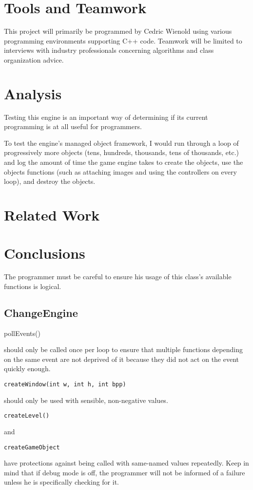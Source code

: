\documentclass[12pt]{article}
\begin{document}
  \section{Tools and Teamwork}
    This project will primarily be programmed by Cedric Wienold using various programming environments supporting C++ code. Teamwork will be limited to interviews with industry professionals concerning algorithms and class organization advice.

  \section{Analysis}
    Testing this engine is an important way of determining if its current programming is at all useful for programmers.

    To test the engine's managed object framework, I would run through a loop of progressively more objects (tens, hundreds, thousands, tens of thousands, etc.) and log the amount of time the game engine takes to create the objects, use the objects functions (such as attaching images and using the controllers on every loop), and destroy the objects.

  \section{Related Work}

  \section{Conclusions}
    The programmer must be careful to ensure his usage of this class's available functions is logical.
\subsection{ChangeEngine}
\begin{verbatim*}pollEvents()\end{verbatim*} should only be called once per loop to ensure that multiple functions depending on the same event are not deprived of it because they did not act on the event quickly enough.
\\

\begin{verbatim}createWindow(int w, int h, int bpp)\end{verbatim} should only be used with sensible, non-negative values.
\\

\begin{verbatim}createLevel()\end{verbatim} and \begin{verbatim}createGameObject\end{verbatim} have protections against being called with same-named values repeatedly. Keep in mind that if debug mode is off, the programmer will not be informed of a failure unless he is specifically checking for it.
\\
\end{document}
